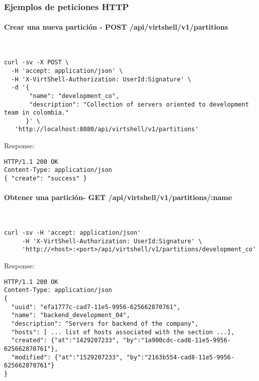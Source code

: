 \subsubsection{Ejemplos de peticiones HTTP}

\paragraph{Crear una nueva partición - POST /api/virtshell/v1/partitions} ~\\

\begin{lstlisting}[style=json]
curl -sv -X POST \
  -H 'accept: application/json' \
  -H 'X-VirtShell-Authorization: UserId:Signature' \
  -d '{
       "name": "development_co",
       "description": "Collection of servers oriented to development team in colombia."
      }' \
   'http://localhost:8080/api/virtshell/v1/partitions'
\end{lstlisting}

Response:

\begin{lstlisting}[style=json]
HTTP/1.1 200 OK
Content-Type: application/json
{ "create": "success" }
\end{lstlisting}

\paragraph{Obtener una partición- GET /api/virtshell/v1/partitions/:name} ~\\

\begin{lstlisting}[style=json]
curl -sv -H 'accept: application/json' 
     -H 'X-VirtShell-Authorization: UserId:Signature' \ 
     'http://<host>:<port>/api/virtshell/v1/partitions/development_co'
\end{lstlisting}

Response:

\begin{lstlisting}[style=json]
HTTP/1.1 200 OK
Content-Type: application/json
{
  "uuid": "efa1777c-cad7-11e5-9956-625662870761",
  "name": "backend_development_04",
  "description": "Servers for backend of the company", 
  "hosts": [ ... list of hosts associated with the section ...],  
  "created": {"at":"1429207233", "by":"1a900cdc-cad8-11e5-9956-625662870761"},
  "modified": {"at":"1529207233", "by":"2163b554-cad8-11e5-9956-625662870761"}
}
\end{lstlisting}

